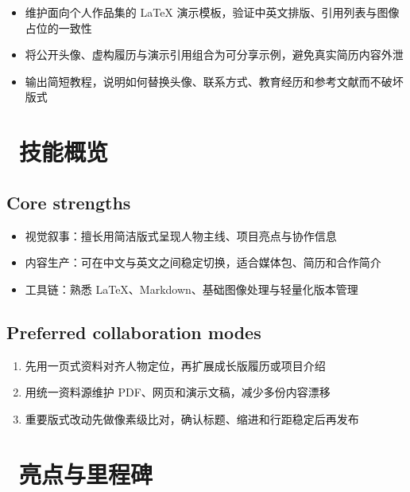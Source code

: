 \documentclass{bensz-cv}
\begin{document}
\begin{itemize}
  \item 维护面向个人作品集的 LaTeX 演示模板，验证中英文排版、引用列表与图像占位的一致性
  \item 将公开头像、虚构履历与演示引用组合为可分享示例，避免真实简历内容外泄
  \item 输出简短教程，说明如何替换头像、联系方式、教育经历和参考文献而不破坏版式
\end{itemize}

\section{\faCogs\ 技能概览}
\subsection{Core strengths}
\begin{itemize}[parsep=0.5ex]
  \item 视觉叙事：擅长用简洁版式呈现人物主线、项目亮点与协作信息
  \item 内容生产：可在中文与英文之间稳定切换，适合媒体包、简历和合作简介
  \item 工具链：熟悉 LaTeX、Markdown、基础图像处理与轻量化版本管理
\end{itemize}

\subsection{Preferred collaboration modes}
\begin{enumerate}[parsep=0.4ex]
  \item 先用一页式资料对齐人物定位，再扩展成长版履历或项目介绍
  \item 用统一资料源维护 PDF、网页和演示文稿，减少多份内容漂移
  \item 重要版式改动先做像素级比对，确认标题、缩进和行距稳定后再发布
\end{enumerate}

\section{\faHeartO\ 亮点与里程碑}
\end{document}
